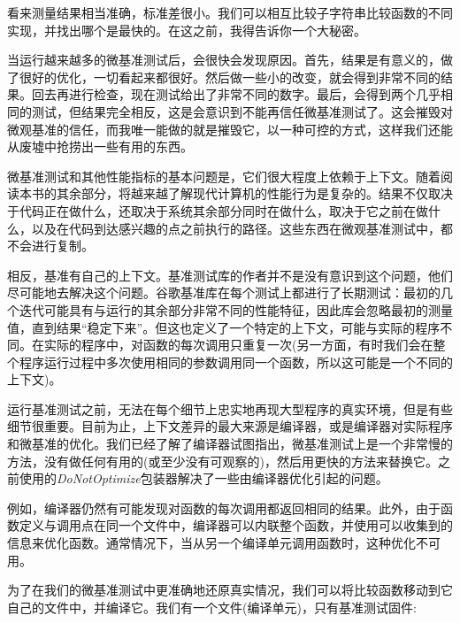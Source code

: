 看来测量结果相当准确，标准差很小。我们可以相互比较子字符串比较函数的不同实现，并找出哪个是最快的。在这之前，我得告诉你一个大秘密。


当运行越来越多的微基准测试后，会很快会发现原因。首先，结果是有意义的，做了很好的优化，一切看起来都很好。然后做一些小的改变，就会得到非常不同的结果。回去再进行检查，现在测试给出了非常不同的数字。最后，会得到两个几乎相同的测试，但结果完全相反，这是会意识到不能再信任微基准测试了。这会摧毁对微观基准的信任，而我唯一能做的就是摧毁它，以一种可控的方式，这样我们还能从废墟中抢捞出一些有用的东西。

微基准测试和其他性能指标的基本问题是，它们很大程度上依赖于上下文。随着阅读本书的其余部分，将越来越了解现代计算机的性能行为是复杂的。结果不仅取决于代码正在做什么，还取决于系统其余部分同时在做什么，取决于它之前在做什么，以及在代码到达感兴趣的点之前执行的路径。这些东西在微观基准测试中，都不会进行复制。

相反，基准有自己的上下文。基准测试库的作者并不是没有意识到这个问题，他们尽可能地去解决这个问题。谷歌基准库在每个测试上都进行了长期测试：最初的几个迭代可能具有与运行的其余部分非常不同的性能特征，因此库会忽略最初的测量值，直到结果“稳定下来”。但这也定义了一个特定的上下文，可能与实际的程序不同。在实际的程序中，对函数的每次调用只重复一次(另一方面，有时我们会在整个程序运行过程中多次使用相同的参数调用同一个函数，所以这可能是一个不同的上下文)。

运行基准测试之前，无法在每个细节上忠实地再现大型程序的真实环境，但是有些细节很重要。目前为止，上下文差异的最大来源是编译器，或是编译器对实际程序和微基准的优化。我们已经了解了编译器试图指出，微基准测试上是一个非常慢的方法，没有做任何有用的(或至少没有可观察的)，然后用更快的方法来替换它。之前使用的\textit{DoNotOptimize}包装器解决了一些由编译器优化引起的问题。

例如，编译器仍然有可能发现对函数的每次调用都返回相同的结果。此外，由于函数定义与调用点在同一个文件中，编译器可以内联整个函数，并使用可以收集到的信息来优化函数。通常情况下，当从另一个编译单元调用函数时，这种优化不可用。

为了在我们的微基准测试中更准确地还原真实情况，我们可以将比较函数移动到它自己的文件中，并编译它。我们有一个文件(编译单元)，只有基准测试固件:

